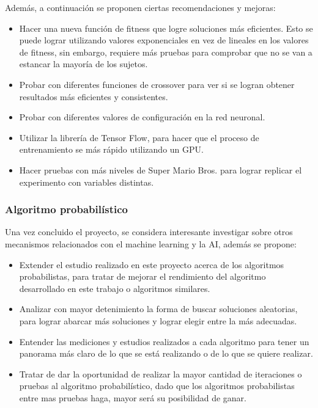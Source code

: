 \documentclass{article}
\begin{document}
Además, a continuación se proponen ciertas recomendaciones y mejoras:
\begin{itemize}
\item Hacer una nueva función de fitness que logre soluciones más eficientes. Esto se puede lograr utilizando valores exponenciales en vez de lineales en los valores de fitness, sin embargo, requiere más pruebas para comprobar que no se van a estancar la mayoría de los sujetos.
\item Probar con diferentes funciones de crossover para ver si se logran obtener resultados más eficientes y consistentes.
\item Probar con diferentes valores de configuración en la red neuronal.
\item Utilizar la librería de Tensor Flow, para hacer que el proceso de entrenamiento se más rápido utilizando un GPU.
\item Hacer pruebas con más niveles de Super Mario Bros. para lograr replicar el experimento con variables distintas.
\end{itemize}

\subsubsection{Algoritmo probabilístico}
Una vez concluido el proyecto, se considera interesante investigar sobre otros mecanismos relacionados con el machine learning y la AI, además se propone:
\begin{itemize}
\item Extender el estudio realizado en este proyecto acerca de los algoritmos probabilistas, para tratar de mejorar el rendimiento del algoritmo desarrollado en este trabajo o algoritmos similares.
\item Analizar con mayor detenimiento la forma de buscar soluciones aleatorias, para lograr abarcar más soluciones y lograr elegir entre la más adecuadas.
\item Entender las mediciones y estudios realizados a cada algoritmo para tener un panorama más claro de lo que se está realizando o de lo que se quiere realizar.
\item Tratar de dar la oportunidad de realizar la mayor cantidad de iteraciones o pruebas al algoritmo probabilístico, dado que los algoritmos probabilistas entre mas pruebas haga, mayor será su posibilidad de ganar.
\end{itemize}

\printbibliography{}
\end{document}
